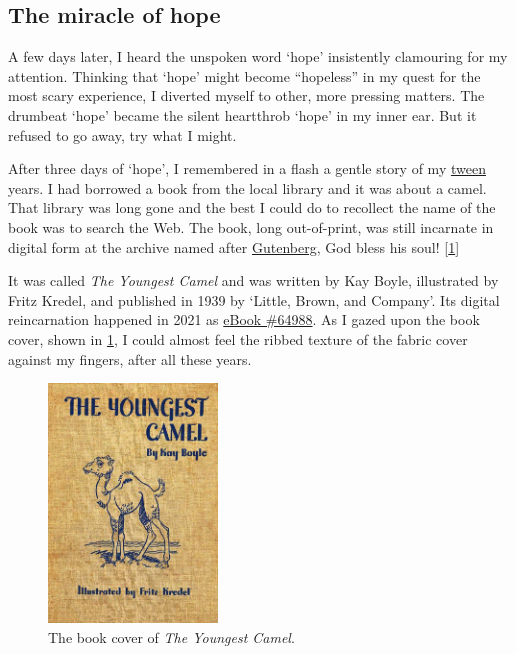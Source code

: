 \documentclass[
  a4paper,
]{article}
\begin{document}
\hypertarget{the-miracle-of-hope}{%
\subsection{The miracle of hope}\label{the-miracle-of-hope}}

A few days later, I heard the unspoken word `hope' insistently
clamouring for my attention. Thinking that `hope' might become
``hopeless'' in my quest for the most scary experience, I diverted
myself to other, more pressing matters. The drumbeat `hope' became the
silent heartthrob `hope' in my inner ear. But it refused to go away, try
what I might.

After three days of `hope', I remembered in a flash a gentle story of my
\href{https://www.thefreedictionary.com/tween}{tween} years. I had
borrowed a book from the local library and it was about a camel. That
library was long gone and the best I could do to recollect the name of
the book was to search the Web. The book, long out-of-print, was still
incarnate in digital form at the archive named after
\href{https://www.newworldencyclopedia.org/entry/Johannes_Gutenberg}{Gutenberg},
God bless his soul! {[}\protect\hyperlink{ref-boyle1939}{1}{]}

It was called \emph{The Youngest Camel} and was written by Kay Boyle,
illustrated by Fritz Kredel, and published in 1939 by `Little, Brown,
and Company'. Its digital reincarnation happened in 2021 as
\href{https://www.gutenberg.org/files/64988/64988-h/64988-h.htm}{eBook
\#64988}. As I gazed upon the book cover, shown in \cref{fig:camel}, I
could almost feel the ribbed texture of the fabric cover against my
fingers, after all these years.

\begin{figure}
\hypertarget{fig:camel}{%
\centering
\includegraphics[width=0.4\textwidth,height=\textheight]{images/camel.jpg}
\caption{The book cover of \emph{The Youngest Camel}.}\label{fig:camel}
}
\end{figure}
\end{document}
